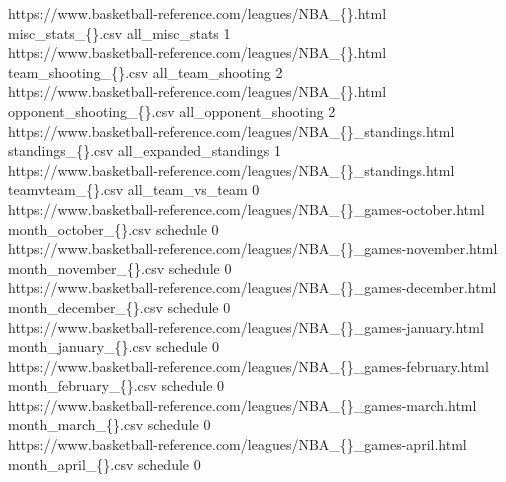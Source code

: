 \documentclass[12pt]{article}%
\begin{document}
https://www.basketball-reference.com/leagues/NBA\_\{\}.html \\misc\_stats\_\{\}.csv all\_misc\_stats 1\\
https://www.basketball-reference.com/leagues/NBA\_\{\}.html \\team\_shooting\_\{\}.csv all\_team\_shooting 2\\
https://www.basketball-reference.com/leagues/NBA\_\{\}.html \\opponent\_shooting\_\{\}.csv all\_opponent\_shooting 2\\
https://www.basketball-reference.com/leagues/NBA\_\{\}\_standings.html\\ standings\_\{\}.csv all\_expanded\_standings 1\\
https://www.basketball-reference.com/leagues/NBA\_\{\}\_standings.html\\ teamvteam\_\{\}.csv all\_team\_vs\_team 0\\
https://www.basketball-reference.com/leagues/NBA\_\{\}\_games-october.html\\ month\_october\_\{\}.csv schedule 0\\
https://www.basketball-reference.com/leagues/NBA\_\{\}\_games-november.html\\ month\_november\_\{\}.csv schedule 0\\
https://www.basketball-reference.com/leagues/NBA\_\{\}\_games-december.html\\ month\_december\_\{\}.csv schedule 0\\
https://www.basketball-reference.com/leagues/NBA\_\{\}\_games-january.html\\ month\_january\_\{\}.csv schedule 0\\
https://www.basketball-reference.com/leagues/NBA\_\{\}\_games-february.html\\ month\_february\_\{\}.csv schedule 0\\
https://www.basketball-reference.com/leagues/NBA\_\{\}\_games-march.html\\ month\_march\_\{\}.csv schedule 0\\
https://www.basketball-reference.com/leagues/NBA\_\{\}\_games-april.html\\ month\_april\_\{\}.csv schedule 0\\
\end{document}
